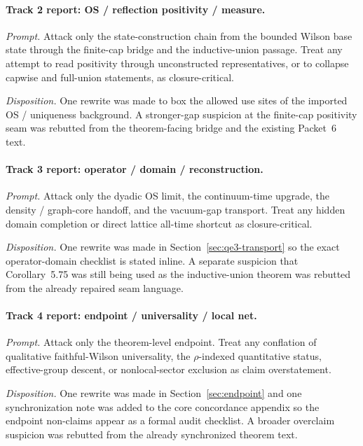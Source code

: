 \paragraph{Track 2 report: OS / reflection positivity / measure.}
\emph{Prompt.} Attack only the state-construction chain from the bounded Wilson base state through the finite-cap bridge and the inductive-union passage. Treat any attempt to read positivity through unconstructed representatives, or to collapse capwise and full-union statements, as closure-critical.\par
\emph{Disposition.} One rewrite was made to box the allowed use sites of the imported OS / uniqueness background. A stronger-gap suspicion at the finite-cap positivity seam was rebutted from the theorem-facing bridge and the existing Packet~6 text.

\paragraph{Track 3 report: operator / domain / reconstruction.}
\emph{Prompt.} Attack only the dyadic OS limit, the continuum-time upgrade, the density / graph-core handoff, and the vacuum-gap transport. Treat any hidden domain completion or direct lattice all-time shortcut as closure-critical.\par
\emph{Disposition.} One rewrite was made in Section~\ref{sec:qe3-transport} so the exact operator-domain checklist is stated inline. A separate suspicion that Corollary~5.75 was still being used as the inductive-union theorem was rebutted from the already repaired seam language.

\paragraph{Track 4 report: endpoint / universality / local net.}
\emph{Prompt.} Attack only the theorem-level endpoint. Treat any conflation of qualitative faithful-Wilson universality, the $\rho$-indexed quantitative status, effective-group descent, or nonlocal-sector exclusion as claim overstatement.\par
\emph{Disposition.} One rewrite was made in Section~\ref{sec:endpoint} and one synchronization note was added to the core concordance appendix so the endpoint non-claims appear as a formal audit checklist. A broader overclaim suspicion was rebutted from the already synchronized theorem text.

